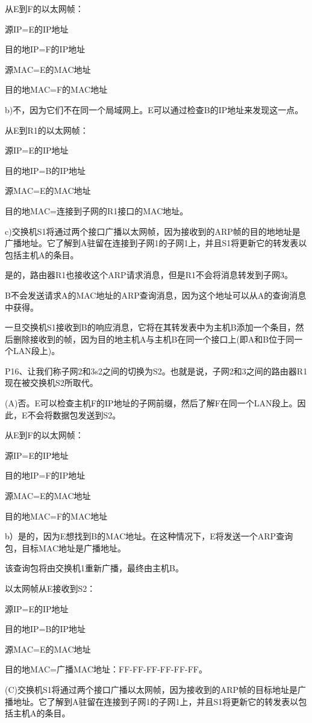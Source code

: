 \documentclass[11pt,UTF8,twoside]{article}
\begin{document}
{		从E到F的以太网帧：
		
		源IP=E的IP地址
		
		目的地IP=F的IP地址
		
		源MAC=E的MAC地址
		
		目的地MAC=F的MAC地址
		
		b)不，因为它们不在同一个局域网上。E可以通过检查B的IP地址来发现这一点。
		
		从E到R1的以太网帧：
		
		源IP=E的IP地址
		
		目的地IP=B的IP地址
		
		源MAC=E的MAC地址
		
		目的地MAC=连接到子网的R1接口的MAC地址。
		
		c)交换机S1将通过两个接口广播以太网帧，因为接收到的ARP帧的目的地地址是广播地址。它了解到A驻留在连接到子网1的子网1上，并且S1将更新它的转发表以包括主机A的条目。
		
		是的，路由器R1也接收这个ARP请求消息，但是R1不会将消息转发到子网3。
		
		B不会发送请求A的MAC地址的ARP查询消息，因为这个地址可以从A的查询消息中获得。
		
		一旦交换机S1接收到B的响应消息，它将在其转发表中为主机B添加一个条目，然后删除接收到的帧，因为目的地主机A与主机B在同一个接口上(即A和B位于同一个LAN段上)。
		
		P16、让我们称子网2和3s2之间的切换为S2。也就是说，子网2和3之间的路由器R1现在被交换机S2所取代。
		
		(A)否。E可以检查主机F的IP地址的子网前缀，然后了解F在同一个LAN段上。因此，E不会将数据包发送到S2。
		
		从E到F的以太网帧：
		
		源IP=E的IP地址
		
		目的地IP=F的IP地址
		
		源MAC=E的MAC地址
		
		目的地MAC=F的MAC地址
		
		b）是的，因为E想找到B的MAC地址。在这种情况下，E将发送一个ARP查询包，目标MAC地址是广播地址。
		
		该查询包将由交换机1重新广播，最终由主机B。
		
		以太网帧从E接收到S2：
		
		源IP=E的IP地址
		
		目的地IP=B的IP地址
		
		源MAC=E的MAC地址
		
		目的地MAC=广播MAC地址：FF-FF-FF-FF-FF-FF。
		
		(C)交换机S1将通过两个接口广播以太网帧，因为接收到的ARP帧的目标地址是广播地址。它了解到A驻留在连接到子网1的子网1上，并且S1将更新它的转发表以包括主机A的条目。
		
}
\end{document}
